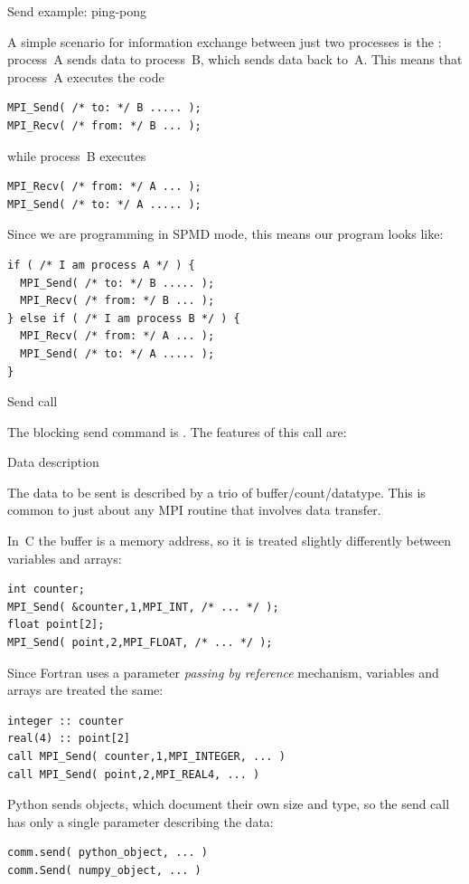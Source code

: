  {Send example: ping-pong}
\label{sec:mpi-send-recv}

A simple scenario for information exchange between just two processes
is the : process~A sends data to process~B, which
sends data back to~A. This means that process~A executes the code
\begin{lstlisting}
MPI_Send( /* to: */ B ..... );
MPI_Recv( /* from: */ B ... );
\end{lstlisting}
while process~B executes
\begin{lstlisting}
MPI_Recv( /* from: */ A ... );
MPI_Send( /* to: */ A ..... );
\end{lstlisting}
Since we are programming in SPMD mode, this means our program looks like:
\begin{lstlisting}
if ( /* I am process A */ ) {
  MPI_Send( /* to: */ B ..... );
  MPI_Recv( /* from: */ B ... );
} else if ( /* I am process B */ ) {
  MPI_Recv( /* from: */ A ... );
  MPI_Send( /* to: */ A ..... );
}
\end{lstlisting}

 {Send call}

The blocking send command is
%
.
%
The features of this call are:

 {Data description}

The data to be sent is described by a trio of buffer/count/datatype.
This is common to just about any MPI routine that involves data
transfer.

In~C the buffer is a memory address, so it is treated slightly
differently between variables and arrays:
\lstset{language=C}
\begin{lstlisting}
int counter;
MPI_Send( &counter,1,MPI_INT, /* ... */ );
float point[2];
MPI_Send( point,2,MPI_FLOAT, /* ... */ );
\end{lstlisting}

Since Fortran uses a parameter
\emph{passing by reference}
mechanism, variables and arrays are treated the same:
\lstset{language=Fortran}
\begin{lstlisting}
integer :: counter
real(4) :: point[2]
call MPI_Send( counter,1,MPI_INTEGER, ... )
call MPI_Send( point,2,MPI_REAL4, ... )
\end{lstlisting}

Python sends objects, which document their own size and type, so the
send call has only a single parameter describing the data:
\lstset{language=Python}
\begin{lstlisting}
comm.send( python_object, ... )
comm.Send( numpy_object, ... )
\end{lstlisting}

